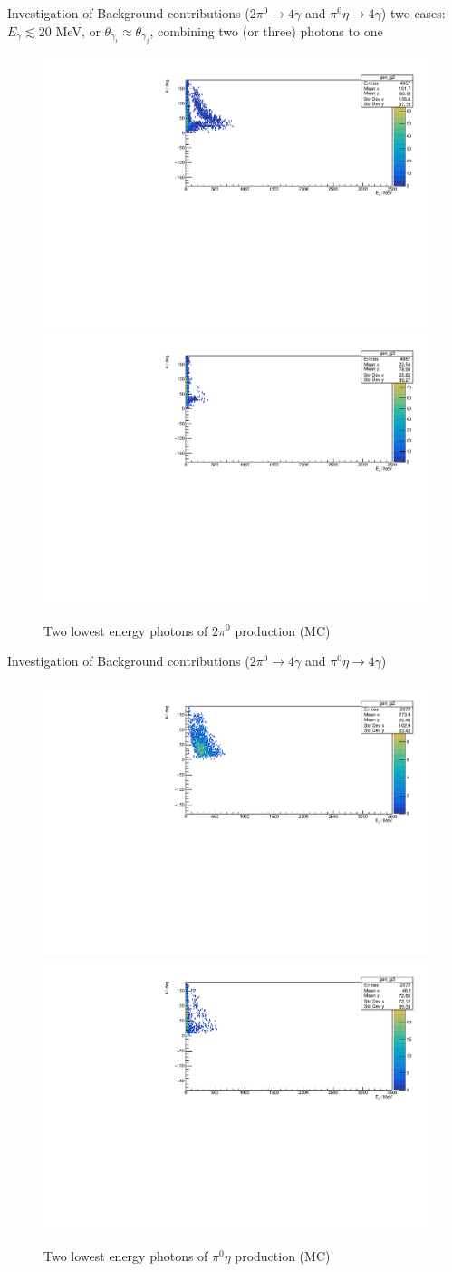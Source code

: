 \documentclass[11pt,aspectratio=169,dvipsnames]{beamer}
\begin{document}
	\begin{frame}{Investigation of Background contributions ($2\pi^0\to4\gamma$ and $\pi^0\eta\to4\gamma$)}
	two cases: $E_\gamma\lesssim 20$ MeV, or $\theta_{\gamma_{i}}\approx\theta_{\gamma_{j}}$, combining two (or three) photons to one
	\begin{figure}
		\includegraphics[width=.49\linewidth]{../../figs/hydrogen/gen_g2_2pi0.pdf}
		\includegraphics[width=.49\linewidth]{../../figs/hydrogen/gen_g3_2pi0.pdf}
		\caption*{Two lowest energy photons of $2\pi^0$ production (MC)}
	\end{figure}
	\end{frame}
	\begin{frame}{Investigation of Background contributions ($2\pi^0\to4\gamma$ and $\pi^0\eta\to4\gamma$)}
	\begin{figure}
		\includegraphics[width=.49\linewidth]{../../figs/hydrogen/gen_g2_pi0eta.pdf}
		\includegraphics[width=.49\linewidth]{../../figs/hydrogen/gen_g3_pi0eta.pdf}
		\caption*{Two lowest energy photons of $\pi^0\eta$ production (MC)}
	\end{figure}
\end{frame}
\end{document}
